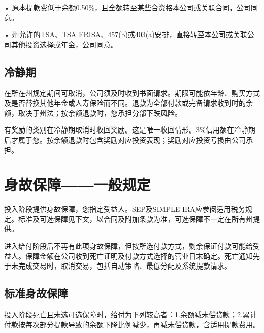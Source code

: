 \documentclass[UTF8,fontset=none,11pt,a4paper]{ctexart}
\begin{document}
• 原本提款费低于余额0.50\%，且全额转至某些合资格本公司或关联合同，\allowbreak\mbox{公司同意。}


• 州允许的TSA、TSA ERISA、457(b)或403(a)安排，直接转至本公司或关联公司其他投资选择或年金，\allowbreak\mbox{公司同意。}


\subsection*{冷静期}
在所在州规定期间可取消，公司须及时收到书面请求。期限可能依年龄、购买方式及是否替换其他年金或人寿保险而不同。退款为全部付款或完备请求收到时的余额，取决于州法；按余额退款时，您承担分部\allowbreak\mbox{下跌风险。}


有奖励的类别在冷静期取消时收回奖励。这是唯一收回情形。3\%信用额在冷静期后才属于您。按余额退款时包含奖励对应投资表现；奖励对应投资亏损由\allowbreak\mbox{公司承担。}


\section*{身故保障——一般规定}
投入阶段提供身故保障，您指定受益人。SEP及SIMPLE IRA应参阅适用税务规定。标准及可选保障见下文，以合同及附加条款为准，可选保障不一定在所\allowbreak\mbox{有州提供。}


进入给付阶段后不再有此项身故保障，但按所选付款方式，剩余保证付款可能给受益人。保障金额在公司收到死亡证明及付款方式选择的营业日末确定。死亡通知先于未完成交易时，取消交易，包括自动策略、最低分配及系统\allowbreak\mbox{提款请求。}


\subsection*{标准身故保障}
投入阶段死亡且未选可选保障时，给付为下列较高者：1.余额减未偿贷款；2.累计付款按每次部分提款导致的余额下降比例减少，再减未偿贷款，含适用\allowbreak\mbox{提款费用。}
\end{document}
